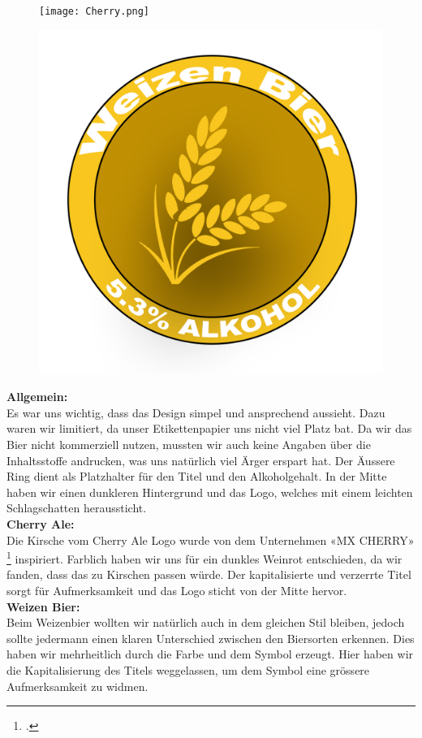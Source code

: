 \begin{figure}[!h]
    \centering
    \begin{minipage}{.5\textwidth}
      \centering
      \texttt{[image: Cherry.png]}
      \label{fig:test1}
    \end{minipage}%
    \begin{minipage}{.5\textwidth}
      \centering
      \includegraphics[width=.7\linewidth]{Figures/Wheat.png}
      \label{fig:test2}
    \end{minipage}
\end{figure}

\textbf{Allgemein:}\\
Es war uns wichtig, dass das Design simpel und ansprechend aussieht. Dazu waren wir limitiert, da unser Etikettenpapier uns nicht viel Platz bat. Da wir das Bier nicht kommerziell nutzen, mussten wir auch keine Angaben über die Inhaltsstoffe andrucken, was uns natürlich viel Ärger erspart hat. Der Äussere Ring dient als Platzhalter für den Titel und den Alkoholgehalt. In der Mitte haben wir einen dunkleren Hintergrund und das Logo, welches mit einem leichten Schlagschatten heraussticht.
\\
\textbf{Cherry Ale:}\\
Die Kirsche vom Cherry Ale Logo wurde von dem Unternehmen «MX CHERRY» \footcite[Die besten Schalter für mechanische Tastaturen]{Cherry}  inspiriert. Farblich haben wir uns für ein dunkles Weinrot entschieden, da wir fanden, dass das zu Kirschen passen würde. Der kapitalisierte und verzerrte Titel sorgt für Aufmerksamkeit und das Logo sticht von der Mitte hervor.
\\
\textbf{Weizen Bier:}\\
Beim Weizenbier wollten wir natürlich auch in dem gleichen Stil bleiben, jedoch sollte jedermann einen klaren Unterschied zwischen den Biersorten erkennen. Dies haben wir mehrheitlich durch die Farbe und dem Symbol erzeugt. Hier haben wir die Kapitalisierung des Titels weggelassen, um dem Symbol eine grössere Aufmerksamkeit zu widmen. 

